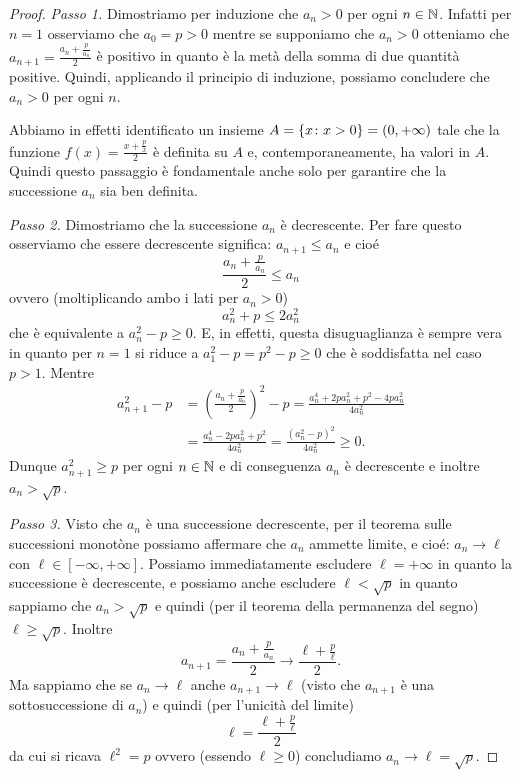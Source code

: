 \begin{proof}
\emph{Passo 1.} Dimostriamo per induzione che $a_n>0$ per ogni $n\in \mathbb N$.
Infatti per $n=1$ osserviamo che $a_0=p>0$ mentre se supponiamo che
$a_n>0$ otteniamo che $a_{n+1} = \frac{a_n + \frac p {a_n}}2$ è positivo in quanto
è la metà della somma di due quantità positive. Quindi, applicando il
principio di induzione, possiamo concludere che $a_n>0$ per ogni $n$.

Abbiamo in effetti identificato un insieme $A={\left\{ x\colon x>0 \right\}} = (0,
+\infty)$ tale che la funzione $f(x) = \frac{x + \frac p x}{2}$ è definita
su $A$ e, contemporaneamente, ha valori in $A$.
Quindi questo passaggio è fondamentale anche solo per
garantire che la successione $a_n$ sia ben definita.

\emph{Passo 2.} Dimostriamo che la successione $a_n$ è decrescente.
Per fare questo osserviamo che essere decrescente significa:
$ a_{n+1} \le a_n$
e cioé
\[
\frac{a_n + \frac p {a_n}}{2} \le a_n
\]
ovvero (moltiplicando ambo i lati per $a_n>0$)
\[
a_n^2 + p \le 2 a_n^2
\]
che è equivalente a $a_n^2 - p \ge 0$. E, in effetti, questa
disuguaglianza è sempre vera in quanto per $n=1$ si riduce a $a_1^2 - p
= p^2 - p \ge 0$ che è soddisfatta nel caso $p>1$. Mentre
\begin{align*}
a_{n+1}^2 - p & = \left(\frac{a_n+\frac p{a_n}}{2}\right)^2 - p
= \frac{a_n^4 + 2 p a_n^2 + p^2 - 4 p a_n^2}{4 a_n^2} \\
& = \frac{a_n^4 - 2 p a_n^2 + p^2}{4 a_n^2}
 = \frac{\left(a_n^2 - p\right)^2}{4a_n^2} \ge 0.
\end{align*}
Dunque $a_{n+1}^2 \ge p$ per ogni $n\in \mathbb N$ e di conseguenza $a_n$ è
decrescente e inoltre $a_n > \sqrt p$.

\emph{Passo 3.}
Visto che $a_n$ è una successione decrescente,
per il teorema sulle successioni monotòne possiamo
affermare che $a_n$ ammette limite, e cioé: $a_n \to \ell$ con $\ell
\in [-\infty, +\infty]$. Possiamo immediatamente escludere
$\ell=+\infty$ in quanto la successione è decrescente, e possiamo
anche escludere $\ell<\sqrt{p}$ in quanto sappiamo che $a_n > \sqrt{p}$ e quindi
(per il teorema della permanenza del segno) $\ell \ge \sqrt p$.
Inoltre
\[
  a_{n+1} = \frac{a_n + \frac p{a_n}}{2} \to \frac{\ell + \frac p \ell}{2}.
\]
Ma sappiamo che se $a_n\to \ell$ anche $a_{n+1}\to \ell$ (visto che
$a_{n+1}$ è una sottosuccessione di $a_n$) e quindi (per l'unicità del
limite)
\begin{equation}\label{ex_1_fixed}
  \ell = \frac{\ell + \frac p \ell}{2}
\end{equation}
da cui si ricava $\ell^2 = p$ ovvero (essendo $\ell\ge 0$) concludiamo
$a_n \to \ell =
\sqrt p$.
\end{proof}

